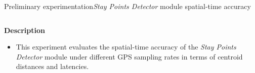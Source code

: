 \begin{frame}{Preliminary experimentation}{\emph{Stay Points Detector} module spatial-time accuracy}
\small

\begin{columns}
\begin{column}[T]{0.55\textwidth}

\begin{block}{\small \textbf{Description}}
\begin{itemize}
  \item This experiment evaluates the spatial-time accuracy of the \emph{Stay Points Detector} module under different GPS sampling rates in terms of centroid distances and latencies.
\end{itemize}
\end{block}

\end{column}
\begin{column}[T]{0.45\textwidth}
\begin{table}
\centering
\renewcommand{\arraystretch}{0.6}
\caption{Input parameters for the spatial-time accuracy of stay points experiment.}
\label{tab:exp-1-input-parameters}
\end{table}
\end{column}
\end{columns}


\end{frame}
